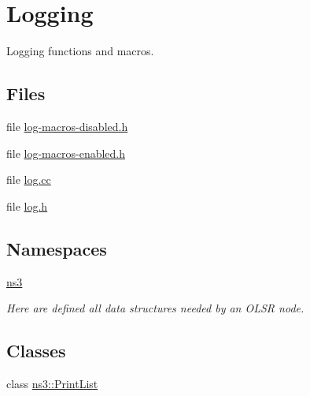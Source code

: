 \hypertarget{group__logging}{}\section{Logging}
\label{group__logging}


Logging functions and macros.  


\subsection*{Files}
\begin{DoxyCompactItemize}
\item 
file \hyperlink{log-macros-disabled_8h}{log-\/macros-\/disabled.\+h}
\item 
file \hyperlink{log-macros-enabled_8h}{log-\/macros-\/enabled.\+h}
\item 
file \hyperlink{log_8cc}{log.\+cc}
\item 
file \hyperlink{log_8h}{log.\+h}
\end{DoxyCompactItemize}
\subsection*{Namespaces}
\begin{DoxyCompactItemize}
\item 
 \hyperlink{namespacens3}{ns3}
\begin{DoxyCompactList}\small\item\em Here are defined all data structures needed by an O\+L\+SR node. \end{DoxyCompactList}\end{DoxyCompactItemize}
\subsection*{Classes}
\begin{DoxyCompactItemize}
\item 
class \hyperlink{classns3_1_1PrintList}{ns3\+::\+Print\+List}
\end{DoxyCompactItemize}
